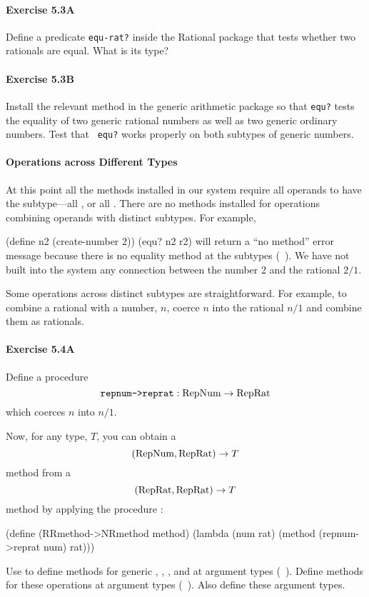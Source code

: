 \paragraph{Exercise 5.3A}
Define a predicate {\tt equ-rat?} inside the Rational package that tests
whether two rationals are equal.  What is its type?

\paragraph{Exercise 5.3B} Install the relevant method in the generic
arithmetic package so that {\tt equ?} tests the equality of two generic
rational numbers as well as two generic ordinary numbers.  Test that {\tt
equ?} works properly on both subtypes of generic numbers.


\paragraph{Operations across Different Types}
At this point all the methods installed in our system require all operands
to have the subtype---all \numtag, or all \rattag.  There are no methods
installed for operations combining operands with distinct subtypes.  For
example,

\beginlisp
(define n2 (create-number 2))
(equ? n2 r2)
\endlisp
will return a ``no method'' error message because there is no equality
method at the subtypes (\numtag\ \rattag).  We have not built into the
system any connection between the number 2 and the rational $2/1$.

Some operations across distinct subtypes are straightforward.  For
example, to combine a rational with a number, $n$, coerce $n$ into the
rational $n/1$ and combine them as rationals.

\paragraph{Exercise 5.4A}
Define a procedure
\[\mbox{\tt repnum->reprat}: \mbox{RepNum} \rightarrow \mbox{RepRat}\]
which coerces $n$ into $n/1$.

Now, for any type, $T$, you can obtain a
\[(\mbox{RepNum},\mbox{RepRat}) \rightarrow T\]
method from a
\[(\mbox{RepRat},\mbox{RepRat}) \rightarrow T\]
method by applying the procedure :

\beginlisp
(define (RRmethod->NRmethod method)
  (lambda (num rat)
    (method
     (repnum->reprat num)
     rat)))
\endlisp

Use  to define methods for generic ,
, , and  at argument types (\numtag\
\rattag).  Define methods for these operations at argument types (\rattag\
\numtag).  Also define  these argument types.

